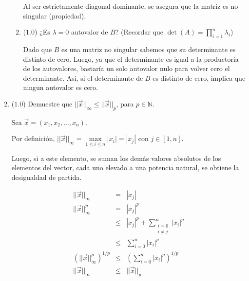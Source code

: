 \documentclass[12pt]{article}
\newcommand{\N}{\ensuremath{\mathbb{N}}}
\begin{document}
\begin{enumerate}[leftmargin=*,widest=9]
\begin{enumerate}[label=\alph*]
    Al ser estrictamente diagonal dominante, se asegura que la matriz es no singular (propiedad).
    
    
    \item (\(1.0\)) ¿Es \(\lambda = 0\) autovalor de \(B\)? (Recordar que \(\det(A) = \prod\limits_{i=1}^n \lambda_i\))
    
    Dado que \(B\) es una matriz no singular sabemos que su determinante es distinto de cero. Luego, ya que el determinante es igual a la productoria de los autovalores, bastaría un solo autovalor nulo para volver cero el determinante. Así, si el determinante de \(B\) es distinto de cero, implica que ningun autovalor es cero.
    
    \end{enumerate}
    
  \item (\(1.0\)) Demuestre que \( ||\vec{x}||_{\infty} \leq ||\vec{x}||_p\), para \(p \in \N\).
  
  Sea \(\vec{x} = (x_1, x_2, \ldots, x_n)\).
  
  Por definición, \( ||\vec{x}||_\infty = \max\limits_{1\leq i\leq n} |x_i|=|x_j|\) con \(j \in [1, n]\).
  
  Luego, si a este elemento, se suman los demás valores absolutos de los elementos del vector, cada uno elevado a una potencia natural, se obtiene la desigualdad de partida.
  
  \begin{eqnarray*}
  || \vec{x} ||_\infty &=& |x_j|\\
  || \vec{x} ||_\infty^p &=& |x_j|^p\\
  & \leq & |x_j|^p + \sum\limits_{\substack{i=0\\i\neq j}}^n |x_i|^p\\
  & \leq &  \sum\limits_{i=0}^n |x_i|^p\\
  (|| \vec{x} ||_\infty^p)^{1/p} & \leq & \left(\sum\limits_{i=0}^n |x_i|^p \right)^{1/p}\\
  || \vec{x} ||_\infty & \leq & || \vec{x} ||_p
  \end{eqnarray*}
    
  \end{enumerate}
\end{document}
